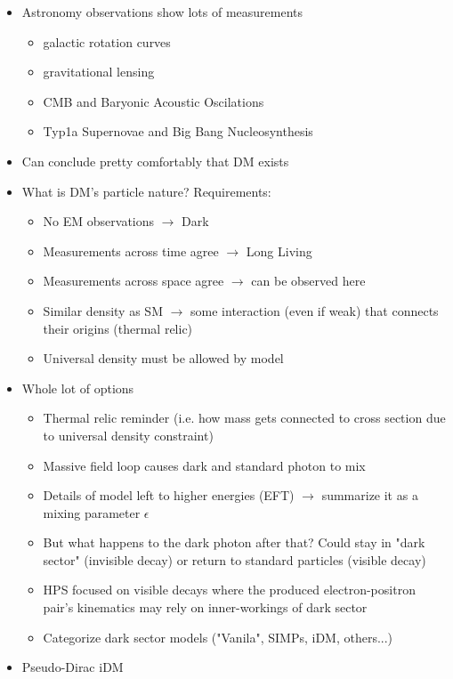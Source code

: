 \begin{itemize}
    \item Astronomy observations show lots of measurements
          \begin{itemize}
              \item galactic rotation curves
              \item gravitational lensing
              \item CMB and Baryonic Acoustic Oscilations
              \item Typ1a Supernovae and Big Bang Nucleosynthesis
          \end{itemize}
    \item Can conclude pretty comfortably that DM exists
    \item What is DM's particle nature? Requirements:
          \begin{itemize}
              \item No EM observations $\rightarrow$ Dark
              \item Measurements across time agree $\rightarrow$ Long Living
              \item Measurements across space agree $\rightarrow$ can be observed here
              \item Similar density as SM $\rightarrow$ some interaction (even if weak) that connects their origins (thermal relic)
              \item Universal density must be allowed by model
          \end{itemize}
    \item Whole lot of options
          \begin{itemize}
              \item Thermal relic reminder (i.e. how mass gets connected to cross section due to universal density constraint)
              \item Massive field loop causes dark and standard photon to mix
              \item Details of model left to higher energies (EFT) $\rightarrow$ summarize it as a mixing parameter $\epsilon$
              \item But what happens to the dark photon after that? Could stay in "dark sector" (invisible decay) or return to standard particles (visible decay)
              \item HPS focused on visible decays where the produced electron-positron pair's kinematics may rely on inner-workings of dark sector
              \item Categorize dark sector models ("Vanila", SIMPs, iDM, others...)
          \end{itemize}
    \item Pseudo-Dirac iDM
\end{itemize}

